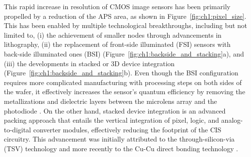 This rapid increase in resolution of CMOS image sensors has been primarily propelled by a reduction of the APS area, as shown in Figure~\ref{fig:ch1:pixel_size}. This has been enabled by multiple technological breakthroughs, including but not limited to, (i) the achievement of smaller nodes through advancements in lithography, (ii) the replacement of front-side illuminated (FSI) sensors with back-side illuminated ones (BSI) (Figure~\ref{fig:ch1:backside_and_stacking}a), and (iii) the developments in stacked or 3D device integration (Figure~\ref{fig:ch1:backside_and_stacking}b). Even though the BSI configuration requires more complicated manufacturing with processing steps on both sides of the wafer, it effectively increases the sensor's quantum efficiency by removing the metallizations and dielectric layers between the microlens array and the photodiode \cite{Vici2020PerformanceConfiguration, Yaung2011HighShrinkage}. On the other hand, stacked device integration is an advanced packing approach that entails the vertical integration of pixel, logic, and analog-to-digital converter modules, effectively reducing the footprint of the CIS circuitry. This advancement was initially attributed to the through-silicon-via (TSV) technology and more recently to the Cu-Cu direct bonding technology \cite{Kagawa20193DSensors}. 

